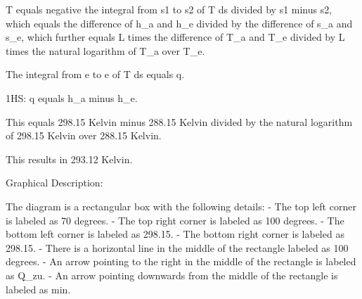 T equals negative the integral from s1 to s2 of T ds divided by s1 minus s2, which equals the difference of h_a and h_e divided by the difference of s_a and s_e, which further equals L times the difference of T_a and T_e divided by L times the natural logarithm of T_a over T_e.

The integral from e to e of T ds equals q.

1HS: q equals h_a minus h_e.

This equals 298.15 Kelvin minus 288.15 Kelvin divided by the natural logarithm of 298.15 Kelvin over 288.15 Kelvin.

This results in 293.12 Kelvin.

Graphical Description:

The diagram is a rectangular box with the following details:
- The top left corner is labeled as 70 degrees.
- The top right corner is labeled as 100 degrees.
- The bottom left corner is labeled as 298.15.
- The bottom right corner is labeled as 298.15.
- There is a horizontal line in the middle of the rectangle labeled as 100 degrees.
- An arrow pointing to the right in the middle of the rectangle is labeled as Q_zu.
- An arrow pointing downwards from the middle of the rectangle is labeled as min.